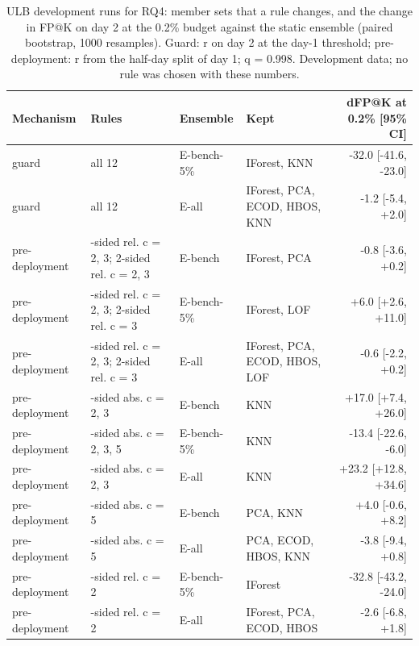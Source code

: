 \begin{table}[t]
\centering
\footnotesize
\setlength{\tabcolsep}{3pt}
\caption{ULB development runs for RQ4: member sets that a rule changes, and the change in FP@K on day 2 at the 0.2\% budget against the static ensemble (paired bootstrap, 1000 resamples). Guard: r on day 2 at the day-1 threshold; pre-deployment: r from the half-day split of day 1; q = 0.998. Development data; no rule was chosen with these numbers.}
\label{tab:ulb-stress}
\begin{tabular}{l>{\raggedright\arraybackslash}p{3.9cm}l>{\raggedright\arraybackslash}p{3.0cm}r}
\toprule
Mechanism & Rules & Ensemble & Kept & dFP@K at 0.2\% [95\% CI] \\
\midrule
guard & all 12 & E-bench-5\% & IForest, KNN & -32.0 [-41.6, -23.0] \\
guard & all 12 & E-all & IForest, PCA, ECOD, HBOS, KNN & -1.2 [-5.4, +2.0] \\
pre-deployment & 1-sided rel. c = 2, 3; 2-sided rel. c = 2, 3 & E-bench & IForest, PCA & -0.8 [-3.6, +0.2] \\
pre-deployment & 1-sided rel. c = 2, 3; 2-sided rel. c = 3 & E-bench-5\% & IForest, LOF & +6.0 [+2.6, +11.0] \\
pre-deployment & 1-sided rel. c = 2, 3; 2-sided rel. c = 3 & E-all & IForest, PCA, ECOD, HBOS, LOF & -0.6 [-2.2, +0.2] \\
pre-deployment & 2-sided abs. c = 2, 3 & E-bench & KNN & +17.0 [+7.4, +26.0] \\
pre-deployment & 2-sided abs. c = 2, 3, 5 & E-bench-5\% & KNN & -13.4 [-22.6, -6.0] \\
pre-deployment & 2-sided abs. c = 2, 3 & E-all & KNN & +23.2 [+12.8, +34.6] \\
pre-deployment & 2-sided abs. c = 5 & E-bench & PCA, KNN & +4.0 [-0.6, +8.2] \\
pre-deployment & 2-sided abs. c = 5 & E-all & PCA, ECOD, HBOS, KNN & -3.8 [-9.4, +0.8] \\
pre-deployment & 2-sided rel. c = 2 & E-bench-5\% & IForest & -32.8 [-43.2, -24.0] \\
pre-deployment & 2-sided rel. c = 2 & E-all & IForest, PCA, ECOD, HBOS & -2.6 [-6.8, +1.8] \\
\bottomrule
\end{tabular}
\end{table}
